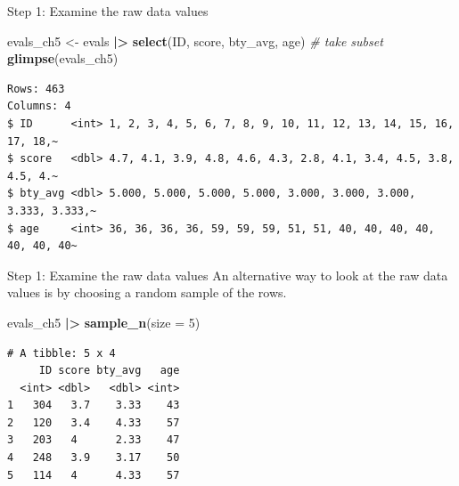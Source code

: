 \documentclass[
  ignorenonframetext,
]{beamer}
\newenvironment{Shaded}{\begin{snugshade}}{\end{snugshade}}
\newcommand{\AttributeTok}[1]{\textcolor[rgb]{0.13,0.29,0.53}{#1}}
\newcommand{\CommentTok}[1]{\textcolor[rgb]{0.56,0.35,0.01}{\textit{#1}}}
\newcommand{\DecValTok}[1]{\textcolor[rgb]{0.00,0.00,0.81}{#1}}
\newcommand{\FunctionTok}[1]{\textcolor[rgb]{0.13,0.29,0.53}{\textbf{#1}}}
\newcommand{\NormalTok}[1]{#1}
\newcommand{\OtherTok}[1]{\textcolor[rgb]{0.56,0.35,0.01}{#1}}
\newcommand{\SpecialCharTok}[1]{\textcolor[rgb]{0.81,0.36,0.00}{\textbf{#1}}}
\begin{document}
\begin{frame}[fragile]{Step 1: Examine the raw data values}
\protect\hypertarget{step-1-examine-the-raw-data-values}{}
\normalsize

\begin{Shaded}
\begin{Highlighting}[]
\NormalTok{evals\_ch5 }\OtherTok{\textless{}{-}}\NormalTok{ evals }\SpecialCharTok{|\textgreater{}}
  \FunctionTok{select}\NormalTok{(ID, score, bty\_avg, age)   }\CommentTok{\# take subset}
\FunctionTok{glimpse}\NormalTok{(evals\_ch5)}
\end{Highlighting}
\end{Shaded}

\begin{verbatim}
Rows: 463
Columns: 4
$ ID      <int> 1, 2, 3, 4, 5, 6, 7, 8, 9, 10, 11, 12, 13, 14, 15, 16, 17, 18,~
$ score   <dbl> 4.7, 4.1, 3.9, 4.8, 4.6, 4.3, 2.8, 4.1, 3.4, 4.5, 3.8, 4.5, 4.~
$ bty_avg <dbl> 5.000, 5.000, 5.000, 5.000, 3.000, 3.000, 3.000, 3.333, 3.333,~
$ age     <int> 36, 36, 36, 36, 59, 59, 59, 51, 51, 40, 40, 40, 40, 40, 40, 40~
\end{verbatim}

\normalsize
\end{frame}

\begin{frame}[fragile]{Step 1: Examine the raw data values}
\protect\hypertarget{step-1-examine-the-raw-data-values-1}{}
An alternative way to look at the raw data values is by choosing a
random sample of the rows.

\normalsize

\begin{Shaded}
\begin{Highlighting}[]
\NormalTok{evals\_ch5 }\SpecialCharTok{|\textgreater{}}
  \FunctionTok{sample\_n}\NormalTok{(}\AttributeTok{size =} \DecValTok{5}\NormalTok{)}
\end{Highlighting}
\end{Shaded}

\begin{verbatim}
# A tibble: 5 x 4
     ID score bty_avg   age
  <int> <dbl>   <dbl> <int>
1   304   3.7    3.33    43
2   120   3.4    4.33    57
3   203   4      2.33    47
4   248   3.9    3.17    50
5   114   4      4.33    57
\end{verbatim}

\normalsize
\end{frame}
\end{document}
